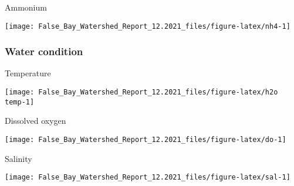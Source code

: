 \documentclass[
]{article}
\begin{document}
Ammonium

\begin{center}\texttt{[image: False\_Bay\_Watershed\_Report\_12.2021\_files/figure-latex/nh4-1]} \end{center}

\newpage

\hypertarget{water-condition}{%
\subsubsection{Water condition}\label{water-condition}}

Temperature

\begin{center}\texttt{[image: False\_Bay\_Watershed\_Report\_12.2021\_files/figure-latex/h2o temp-1]} \end{center}

\newpage

Dissolved oxygen

\begin{center}\texttt{[image: False\_Bay\_Watershed\_Report\_12.2021\_files/figure-latex/do-1]} \end{center}

\newpage

Salinity

\begin{center}\texttt{[image: False\_Bay\_Watershed\_Report\_12.2021\_files/figure-latex/sal-1]} \end{center}
\end{document}
